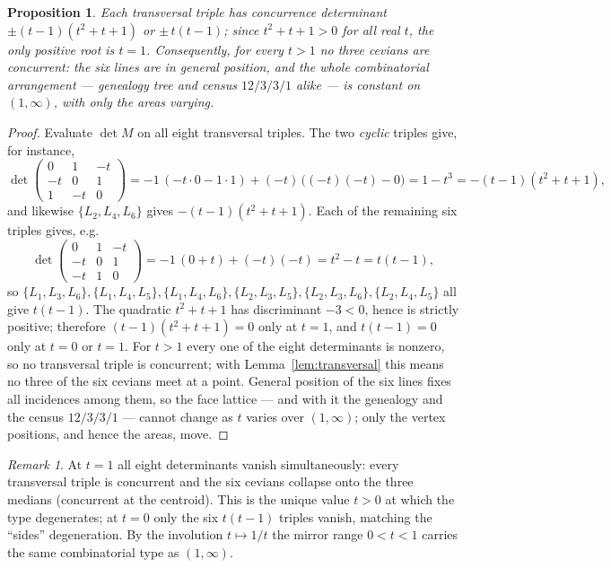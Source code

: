 \documentclass[11pt,a4paper,reqno]{amsart}
\newtheorem{proposition}[theorem]{Proposition}
\theoremstyle{definition}
\theoremstyle{remark}
\newtheorem{remark}[theorem]{Remark}
\begin{document}
\begin{proposition}\label{prop:rigid}
Each transversal triple has concurrence determinant $\pm(t-1)(t^2+t+1)$ or $\pm\,t(t-1)$; since $t^2+t+1>0$ for
all real $t$, the only positive root is $t=1$. Consequently, for every $t>1$ no three cevians are concurrent: the
six lines are in general position, and the whole combinatorial arrangement --- genealogy tree and census
$12/3/3/1$ alike --- is constant on $(1,\infty)$, with only the areas varying.
\end{proposition}
\begin{proof}
Evaluate $\det M$ on all eight transversal triples. The two \emph{cyclic} triples give, for instance,
\[
\det\!\begin{pmatrix}0&1&-t\\ -t&0&1\\ 1&-t&0\end{pmatrix}
=-1\,(-t\cdot0-1\cdot1)+(-t)\,\big((-t)(-t)-0\big)=1-t^3=-(t-1)(t^2+t+1),
\]
and likewise $\{L_2,L_4,L_6\}$ gives $-(t-1)(t^2+t+1)$. Each of the remaining six triples gives, e.g.
\[
\det\!\begin{pmatrix}0&1&-t\\ -t&0&1\\ -t&1&0\end{pmatrix}
=-1\,(0+t)+(-t)(-t)=t^2-t=t(t-1),
\]
so $\{L_1,L_3,L_6\},\{L_1,L_4,L_5\},\{L_1,L_4,L_6\},\{L_2,L_3,L_5\},\{L_2,L_3,L_6\},\{L_2,L_4,L_5\}$ all give
$t(t-1)$. The quadratic $t^2+t+1$ has discriminant $-3<0$, hence is strictly positive; therefore
$(t-1)(t^2+t+1)=0$ only at $t=1$, and $t(t-1)=0$ only at $t=0$ or $t=1$. For $t>1$ every one of the eight
determinants is nonzero, so no transversal triple is concurrent; with Lemma~\ref{lem:transversal} this means no
three of the six cevians meet at a point. General position of the six lines fixes all incidences among them, so
the face lattice --- and with it the genealogy and the census $12/3/3/1$ --- cannot change as $t$ varies over
$(1,\infty)$; only the vertex positions, and hence the areas, move.
\end{proof}

\begin{remark}
At $t=1$ all eight determinants vanish simultaneously: every transversal triple is concurrent and the six cevians
collapse onto the three medians (concurrent at the centroid). This is the unique value $t>0$ at which the type
degenerates; at $t=0$ only the six $t(t-1)$ triples vanish, matching the ``sides'' degeneration. By the involution
$t\mapsto1/t$ the mirror range $0<t<1$ carries the same combinatorial type as $(1,\infty)$.
\end{remark}
\end{document}
